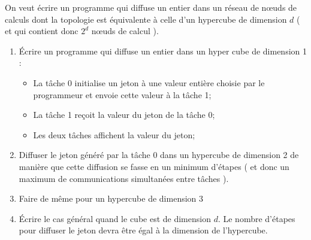 \documentclass[11pt,a4paper]{article}
\begin{document}
On veut écrire un programme qui diffuse un entier dans un réseau de n{\oe}uds de calculs dont la topologie
est équivalente à celle d'un hypercube de dimension $d$ ( et qui contient donc $2^{d}$ n{\oe}uds de calcul ).

\begin{enumerate}
\item \'Ecrire un programme qui diffuse un entier dans un hyper cube de dimension 1 :
\begin{itemize}
\item La tâche 0 initialise un jeton à une valeur entière choisie par le programmeur et envoie cette valeur 
à la tâche 1; 
\item La tâche 1 reçoit la valeur du jeton de la tâche 0;
\item Les deux tâches affichent la valeur du jeton;
\end{itemize}
\item Diffuser le jeton généré par la tâche 0 dans un hypercube de dimension 2 de manière que cette diffusion se fasse en un minimum
d'étapes ( et donc un maximum de communications simultanées entre tâches ).
\item Faire de même pour un hypercube de dimension 3
\item \'Ecrire le cas général quand le cube est de dimension $d$. Le nombre d'étapes pour diffuser le jeton devra
être égal à la dimension de l'hypercube.
\end{enumerate}
\end{document}
